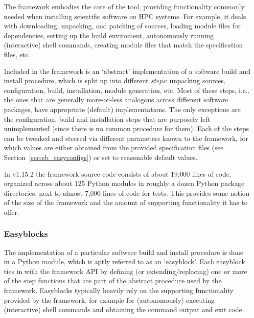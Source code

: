 The \easybuild{} framework embodies the core of the tool,
providing functionality commonly needed when installing scientific software on HPC
systems. For example, it deals with downloading, unpacking, and patching of sources,
loading module files for dependencies, setting up the build enviroment, autonomously
running (interactive) shell commands, creating module files that match the
specification files, etc.

Included in the framework is an `abstract' implementation of a software build and
install procedure, which is split up into different \emph{steps}: unpacking sources,
configuration, build, installation, module generation, etc. Most of these steps,
i.e., the ones that are generally more-or-less analogous across
different software packages, have appropriate (default) implementations. The only
exceptions are the configuration, build and installation steps that are purposely
left unimplemented (since there is no common procedure for them). Each of the steps
can be tweaked and steered via different parameters known to the framework, for
which values are either obtained from the provided specification files (see
Section~\ref{sec:eb_easyconfigs}) or set to reasonable default values.

In \easybuild{} v1.15.2 the framework source code consists of about 19,000 lines
of code, organized across about 125 Python modules in roughly a dozen Python
package directories, next to almost 7,000 lines of code for tests. This provides some
notion of the size of the \easybuild{} framework and the amount of supporting
functionality it has to offer.

\subsubsection{Easyblocks}
\label{sec:eb_easyblocks}

The implementation of a particular software build and install procedure is done in
a Python module, which is aptly referred to as an `easyblock'. Each easyblock
ties in with the framework API by defining (or extending/replacing) one or more of
the step functions that are part of the abstract procedure used by the
\easybuild{} framework. Easyblocks typically heavily rely on the supporting
functionality provided by the framework, for example for (autonomously)
executing (interactive) shell commands and obtaining the command output and
exit code.

